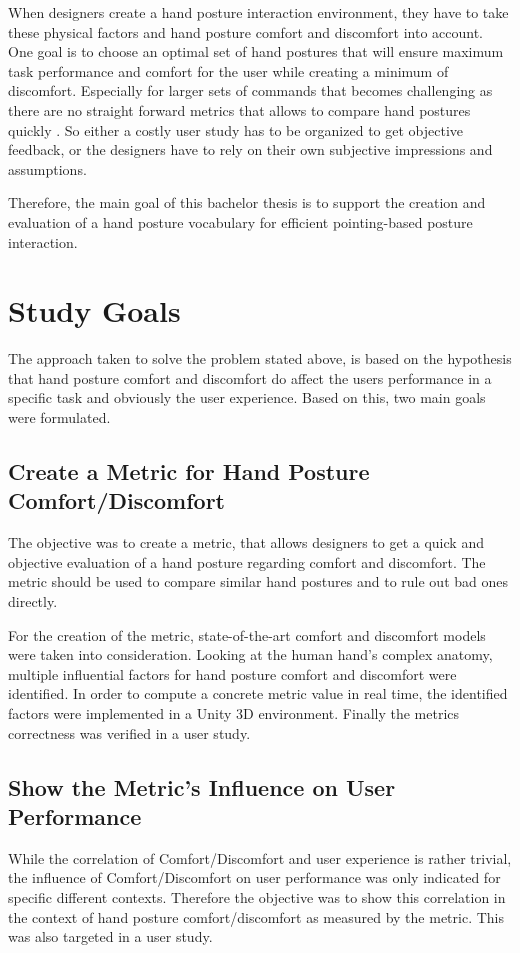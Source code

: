 When designers create a hand posture interaction environment, they have to take these physical factors and hand posture comfort and discomfort into account. One goal is to choose an optimal set of hand postures that will ensure maximum task performance and comfort for the user while creating a minimum of discomfort. Especially for larger sets of commands that becomes challenging as there are no straight forward metrics that allows to compare hand postures quickly \cite{naddeo2015proposal}. So either a costly user study has to be organized to get objective feedback, or the designers have to rely on their own subjective impressions and assumptions.

Therefore, the main goal of this bachelor thesis is to support the creation and evaluation of a hand posture vocabulary for efficient pointing-based posture interaction.

\section{Study Goals}

The approach taken to solve the problem stated above, is based on the hypothesis that hand posture comfort and discomfort do affect the users performance in a specific task and obviously the user experience. Based on this, two main goals were formulated.

\subsection{Create a Metric for Hand Posture Comfort/Discomfort}

The objective was to create a metric, that allows designers to get a quick and objective evaluation of a hand posture regarding comfort and discomfort. The metric should be used to compare similar hand postures and to rule out bad ones directly. 

For the creation of the metric, state-of-the-art comfort and discomfort models were taken into consideration. Looking at the human hand's complex anatomy, multiple influential factors for hand posture comfort and discomfort were identified. In order to compute a concrete metric value in real time, the identified factors were implemented in a Unity 3D environment. Finally the metrics correctness was verified in a user study.

\subsection{Show the Metric's Influence on User Performance}

While the correlation of Comfort/Discomfort and user experience is rather trivial, the influence of Comfort/Discomfort on user performance was only indicated for specific different contexts. Therefore the objective was to show this correlation in the context of hand posture comfort/discomfort as measured by the metric. This was also targeted in a user study. 